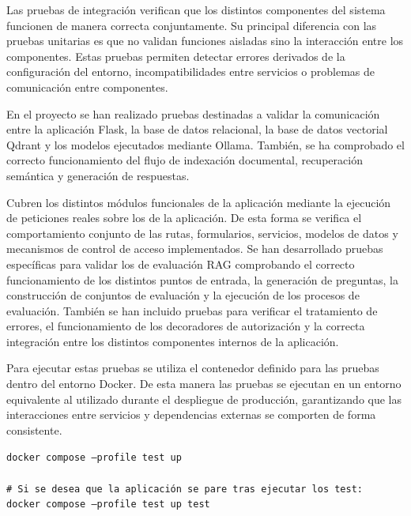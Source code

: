 Las pruebas de integración verifican que los distintos componentes del sistema funcionen de manera correcta conjuntamente. Su principal diferencia con las pruebas unitarias es que no validan funciones aisladas sino la interacción entre los componentes. Estas pruebas permiten detectar errores derivados de la configuración del entorno, incompatibilidades entre servicios o problemas de comunicación entre componentes.

En el proyecto se han realizado pruebas destinadas a validar la comunicación entre la aplicación Flask, la base de datos relacional, la base de datos vectorial Qdrant y los modelos ejecutados mediante Ollama. También, se ha comprobado el correcto funcionamiento del flujo de indexación documental, recuperación semántica y generación de respuestas.

Cubren los distintos módulos funcionales de la aplicación mediante la ejecución de peticiones reales sobre los  de la aplicación. De esta forma se verifica el comportamiento conjunto de las rutas, formularios, servicios, modelos de datos y mecanismos de control de acceso implementados. Se han desarrollado pruebas específicas para validar los  de evaluación RAG comprobando el correcto funcionamiento de los distintos puntos de entrada, la generación de preguntas, la construcción de conjuntos de evaluación y la ejecución de los procesos de evaluación. También se han incluido pruebas para verificar el tratamiento de errores, el funcionamiento de los decoradores de autorización y la correcta integración entre los distintos componentes internos de la aplicación.

Para ejecutar estas pruebas se utiliza el contenedor definido para las pruebas dentro del entorno Docker. De esta manera las pruebas se ejecutan en un entorno equivalente al utilizado durante el despliegue de producción, garantizando que las interacciones entre servicios y dependencias externas se comporten de forma consistente.

\begin{tcolorbox}[
	colback=black!3,
	colframe=black!30,
	boxrule=0.5pt,
	arc=2mm,
	title= Terminal - Ejecución de pruebas mediante Docker,
	fonttitle=\bfseries,
	breakable 
]
	{\footnotesize
		\noindent
		\texttt{docker compose --profile test up}\\
		\\
		\texttt{\# Si se desea que la aplicación se pare tras ejecutar los test:}\\
		\texttt{docker compose --profile test up test}
	}
\end{tcolorbox}

